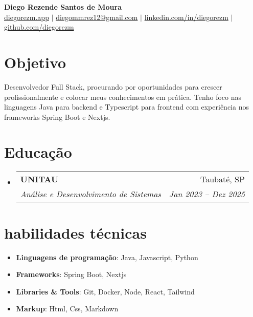 \documentclass[letterpaper,10pt]{article}
\makeatletter
\newcommand{\resumeItem}[1]{\item\small{#1}}
\newcommand{\resumeSubheading}[4]{
\vspace{-1pt}\item
  \begin{tabular*}{0.97\textwidth}[t]{l@{\extracolsep{\fill}}r}
    \textbf{#1} & #2 \\
    \textit{#3} & \textit{#4} \\
  \end{tabular*}\vspace{-7pt}
}
\newcommand{\resumeSubHeadingList}{\begin{itemize}[leftmargin=0.15in, label={}]}
\newcommand{\resumeSubHeadingListEnd}{\end{itemize}}
\makeatother
\begin{document}
\begin{center}
  \textbf{\Huge Diego Rezende Santos de Moura} \\
  \small \href{https://diegorezm.netlify.app/}{diegorezm.app} $|$ \href{mailto:diegommrez12@gmail.com}{diegommrez12@gmail.com} $|$ 
  \href{https://linkedin.com/in/diegorezm}{linkedin.com/in/diegorezm} $|$
  \href{https://github.com/diegorezm}{github.com/diegorezm}
\end{center}

\section*{Objetivo}
Desenvolvedor Full Stack, procurando por oportunidades para crescer profissionalmente e colocar meus conhecimentos em prática. Tenho foco nas linguagens Java para backend e Typescript para frontend com experiência nos frameworks Spring Boot e Nextjs.

\section{Educação}
\resumeSubHeadingList
  \resumeSubheading
      {UNITAU}{Taubaté, SP}
      {Análise e Desenvolvimento de Sistemas} {Jan 2023 -- Dez 2025}
\resumeSubHeadingListEnd

\section{habilidades técnicas}
\resumeSubHeadingList
  \resumeItem{\textbf{Linguagens de programação}: Java, Javascript, Python}
  \resumeItem{\textbf{Frameworks}: Spring Boot, Nextjs}
  \resumeItem{\textbf{Libraries \& Tools}: Git, Docker, Node, React, Tailwind}
   \resumeItem{\textbf{Markup}: Html, Css, Markdown}
\resumeSubHeadingListEnd
\end{document}
